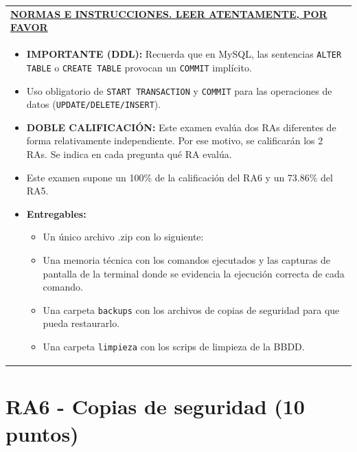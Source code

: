 \documentclass[12pt,a4paper]{article}
\begin{document}
\vspace{0.5cm}

\noindent
\begin{tabularx}{\textwidth}{|X|}
    \hline
    \textbf{\underline{NORMAS E INSTRUCCIONES. LEER ATENTAMENTE, POR FAVOR}} \\
    \begin{itemize}[label=$\blacksquare$, leftmargin=1cm, nosep, after=\vspace{0.2cm}]
        \item \textbf{IMPORTANTE (DDL):} Recuerda que en MySQL, las sentencias \texttt{ALTER TABLE} o \texttt{CREATE TABLE} provocan un \texttt{COMMIT} implícito.
        \item Uso obligatorio de \texttt{START TRANSACTION} y \texttt{COMMIT} para las operaciones de datos (\texttt{UPDATE/DELETE/INSERT}).
        \item \textbf{DOBLE CALIFICACIÓN:} Este examen evalúa dos RAs diferentes de forma relativamente independiente. Por ese motivo, se calificarán los 2 RAs. Se indica en cada pregunta qué RA evalúa.
        \item Este examen supone un 100\% de la calificación del RA6 y un 73.86\% del RA5.

        \item \textbf{Entregables:}
        \begin{itemize}
        \item Un único archivo .zip con lo siguiente:
        \item Una memoria técnica con los comandos ejecutados y las capturas de pantalla de la terminal donde se evidencia la ejecución correcta de cada comando.
        \item Una carpeta \texttt{backups} con los archivos de copias de seguridad para que pueda restaurarlo.
        \item Una carpeta \texttt{limpieza} con los scrips de limpieza de la BBDD.
        \end{itemize}

    \end{itemize} \\ \hline
\end{tabularx}

\vspace{0.5cm}

\section{RA6 - Copias de seguridad (10 puntos)}
\end{document}
